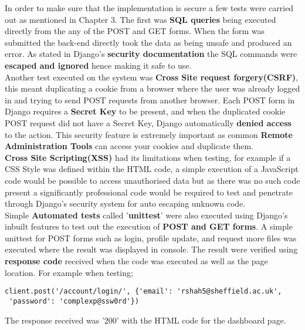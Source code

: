 \documentclass[../main.tex]{subfiles}
\begin{document}
\raggedright
In order to make sure that the implementation is secure a few tests were carried out as mentioned in Chapter 3. The first was \textbf{SQL queries} being executed directly from the any of the POST and GET forms. When the form was submitted the back-end directly took the data as being unsafe and produced an error. As stated in Django's \textbf{security documentation}\cite{djangoSecurity} the SQL commands were \textbf{escaped and ignored} hence making it safe to use. \\[4mm]

Another test executed on the system was \textbf{Cross Site request forgery(CSRF)}, this meant duplicating a cookie from a browser where the user was already logged in and trying to send POST requests from another browser. Each POST form in Django requires a \textbf{Secret Key} to be present, and when the duplicated cookie POST request did not have a Secret Key, Django automatically \textbf{denied access} to the action. This security feature is extremely important as common \textbf{Remote Administration Tools} can access your cookies and duplicate them. \\[4mm]

\textbf{Cross Site Scripting(XSS)} had its limitations when testing, for example if a CSS Style was defined within the HTML code, a simple execution of a JavaScript code would be possible to access unauthorised data but as there was no such code present a significantly professional code would be required to test and penetrate through Django's security system for auto escaping unknown code. \\[4mm]

Simple \textbf{Automated tests} called '\textbf{unittest}' were also executed using Django's inbuilt features to test out the execution of\textbf{ POST and GET forms}. A simple unittest for POST forms such as login, profile update, and request more files was executed where the result was displayed in console. The result were verified using \textbf{response code} received when the code was executed as well as the page location. For example when testing; \\
\begin{verbatim}
client.post('/account/login/', {'email': 'rshah5@sheffield.ac.uk',
 'password': 'complexp@ssw0rd'}) 
\end{verbatim}
The response received was '200' with the HTML code for the dashboard page. \\[4mm]
\end{document}
